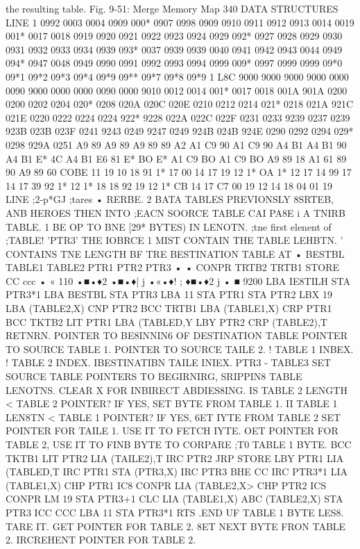 {{{{{{{{{{{{{{{{{{{{{{{{{{{{{{{{{{{{{{{{{{{{{{{{{{{{{{{{{{{{{{{{{{{{{{{{{{{{{{{{{{{{{{{{{{{{{{{the resulting table.
Fig. 9-51: Merge Memory Map
340
DATA STRUCTURES
LINE 1
0992
0003
0004
0909
000*
0907
0998
0909
0910
0911
0912
0913
0014
0019
001*
0017
0018
0919
0920
0921
0922
0923
0924
0929
092*
0927
0928
0929
0930
0931
0932
0933
0934
0939
093*
0037
0939
0939
0040
0941
0942
0943
0044
0949
094*
0947
0048
0949
0990
0991
0992
0993
0994
0999
009*
0997
0999
0999
09*0
09*1
09*2
09*3
09*4
09*9
09**
09*7
09*8
09*9
1 L8C
9000
9000
9000
9000
0000
0090
9000
0000
0000
0090
0000
9010
0012
0014
001*
0017
0018
001A
901A
0200
0200
0202
0204
020*
0208
020A
020C
020E
0210
0212
0214
021*
0218
021A
921C
021E
0220
0222
0224
0224
922*
9228
022A
022C
022F
0231
0233
9239
0237
0239
923B
023B
023F
0241
9243
0249
9247
0249
924B
024B
924E
0290
0292
0294
029*
0298
929A
0251
A9
89
A9
89
A9
89
89
A2
A1
C9
90
A1
C9
90
A4
B1
A4
B1
90
A4
B1
E*
4C
A4
B1
E6
81
E*
BO
E*
A1
C9
BO
A1
C9
BO
A9
89
18
A1
61
89
90
A9
89
60
COBE
11
19
10
18
91
1*
17
00
14
17
19
12
1*
OA
1*
12
17
14
99
17
14
17
39 92
1*
12
1*
18
18
92
19
12
1*
CB
14
17
C7
00
19
12
14
18
04
01
19
LINE
;2-p*GJ
;tares
• RERBE.
2 BATA TABLES PREVIONSLY 8SRTEB,
{ANB HEROES THEN INTO
;EACN SOORCE TABLE CAI
{PA8E i
A TNIRB TABLE.
1 BE OP TO BNE
[29* BYTES) IN LENOTN.
;tne first elenent of
;TABLE!
{'PTR3'
THE IOBRCE
1 MIST CONTAIN THE TABLE LEHBTN.
' CONTAINS TNE LENGTH BF TRE
{BESTINATION TABLE AT
•
BESTBL
TABLE1
TABLE2
PTR1
PTR2
PTR3
•
•
CONPR
TRTB2
TRTB1
STORE
CC
ccc
• « 110
•■•♦2
•■•♦| j
•«•♦! ;
♦■•♦2 j
• ■ 9200
LBA IE8TILH
STA PTR3*1
LBA BESTBL
STA PTR3
LBA 11
STA PTR1
STA PTR2
LBX 19
LBA (TABLE2,X)
CNP PTR2
BCC TRTB1
LBA (TABLE1,X)
CRP PTR1
BCC TKTB2
LIT PTR1
LBA (TABLED,Y
LBY PTR2
CRP (TABLE2),T
RETNRN.
{POINTER TO BE8INNIN6 OF DESTINATION TABLE
{POINTER TO SOURCE TABLE 1.
{POINTER TO SOURCE TAILE 2.
! TABLE 1 INBEX.
! TABLE 2 INDEX.
IBESTINATIBN TAILE INIEX.
{PTR3 - TABLE3
{SET SOURCE TABLE POINTERS TO BEGIRNIRG,
{SRIPPIN8 TABLE LENOTNS.
{CLEAR X FOR INBIRECT ABDIES8ING.
{IS TABLE 2 LENGTH <
{TABLE 2 POINTER?
{IF YES, SET BYTE FROM TABLE 1.
{II TABLE 1 LEN8TN <
{TABLE 1 POINTER?
{IF YES, 6ET IYTE FROM TABLE 2
{SET POINTER FOR TAILE 1.
{USE IT TO FETCH IYTE.
{OET POINTER FOR TABLE 2,
{USE IT TO FINB BYTE TO CORPARE
;T0 TABLE 1 BYTE.
BCC TKTB1
LIT PTR2
LIA (TAILE2),T
IRC PTR2
JRP STORE
LBY PTR1
LIA (TABLED,T
IRC PTR1
STA (PTR3,X)
IRC PTR3
BHE CC
IRC PTR3*1
LIA (TABLE1,X)
CHP PTR1
IC8 CONPR
LIA (TABLE2,X>
CHP PTR2
ICS CONPR
LM 19
STA PTR3+1
CLC
LIA (TABLE1,X)
ABC (TABLE2,X)
STA PTR3
ICC CCC
LBA 11
STA PTR3*1
RTS
.END
UF TABLE 1 BYTE LES8. TARE IT.
{GET POINTER FOR TABLE 2.
{8ET NEXT BYTE FRON TABLE 2.
{IRCREHENT POINTER FOR TABLE 2.
}}}}}}}}}}}}}}}}}}}}}}}}}}}}}}}}}}}}}}}}}}}}}}}}}}}}}}}}}}}}}}}}}}}}}}}}}}}}}}}}}}}}}}}}}}}}}}}}}}}}}}}}}}}}}}}}}}}}}}}
